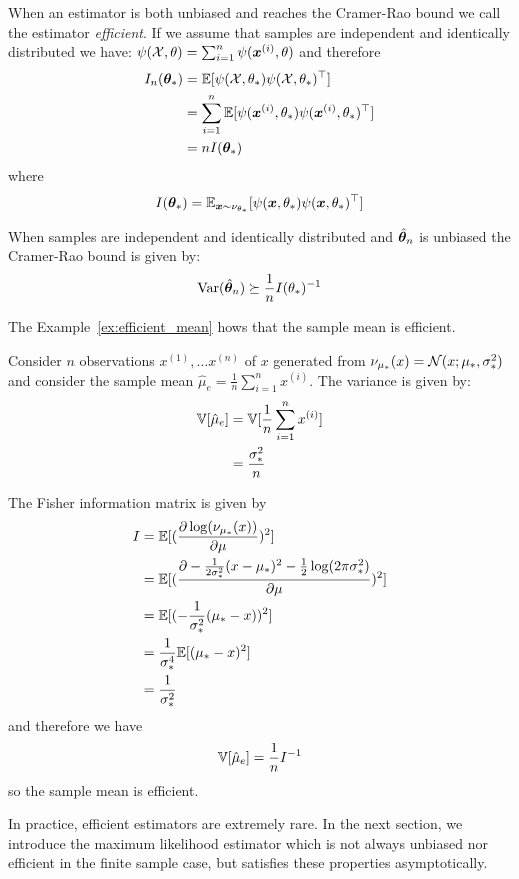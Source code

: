 When an estimator is both unbiased and reaches the Cramer-Rao bound we call the
estimator \emph{efficient}.
If we assume that samples are independent and identically distributed we
have: $\psi(\mathcal{X}, \theta) = \sum_{i=1}^n \psi(\boldsymbol{x}^{(i)}, \theta)$ and therefore
\begin{align}
  I_n(\boldsymbol{\theta}_*) &= \mathbb{E}[\psi(\mathcal{X}, \theta_*) \psi(\mathcal{X}, \theta_*)^{\top}] \\
                 &= \sum_{i=1}^n \mathbb{E}[\psi(\boldsymbol{x}^{(i)}, \theta_*) \psi(\boldsymbol{x}^{(i)}, \theta_*)^{\top}] \\
               &= n I(\boldsymbol{\theta}_*)
\end{align}
where
\begin{align}
  I(\boldsymbol{\theta}_*) = \mathbb{E}_{\boldsymbol{x} \sim \nu_{\theta_*}} [\psi(\boldsymbol{x}, \theta_*) \psi(\boldsymbol{x}, \theta_*)^{\top}]
\end{align}

When samples are independent and identically distributed and $\hat{\boldsymbol{\theta}}_n$ is unbiased the Cramer-Rao
bound is given by:
\begin{equation}
  \operatorname*{Var}(\hat{\boldsymbol{\theta}}_n) \succeq \frac1{n} I(\theta_*)^{-1}
\end{equation}

The Example~\ref{ex:efficient_mean} hows that the sample mean
is efficient.
\begin{example}
  \label{ex:efficient_mean}
  Consider $n$ observations $x^{(1)},
  \dots x^{(n)}$ of $x$ generated from $\nu_{\mu_*}(x) = \mathcal{N}(x; \mu_*, \sigma_*^2)$
  and consider the sample mean $\hat{\mu}_e = \frac1{n} \sum_{i=1}^n x^{(i)}$.
  The variance is given by:
  \begin{align}
    \mathbb{V}[\hat{\mu}_e] &= \mathbb{V}[\frac1{n} \sum_{i=1}^n x^{(i)}] \\
    &= \frac{\sigma_*^2}{n}
  \end{align}

  The Fisher information matrix is given by
  \begin{align}
    I &= \mathbb{E}[(\frac{ \partial \log(\nu_{\mu_*}(x))}{\partial \mu})^2] \\
      &= \mathbb{E}[(\frac{ \partial -\frac1{2 \sigma_*^2} (x - \mu_*)^2 - \frac12\log(2\pi \sigma_*^2)}{\partial \mu})^2] \\
      &= \mathbb{E}[(-\frac1{\sigma_*^2} (\mu_* - x))^2] \\
      &= \frac1{\sigma_*^4}\mathbb{E} [(\mu_* - x)^2] \\
      &= \frac1{\sigma_*^2}
  \end{align}
  and therefore we have
  \begin{equation}
  \mathbb{V}[\hat{\mu}_e]  = \frac1{n} I^{-1}
  \end{equation}
  so the sample mean is efficient.
\end{example}
In practice, efficient estimators are extremely rare. In the next section, we
introduce the maximum likelihood estimator which is not always unbiased nor
efficient in the finite sample case, but satisfies these properties asymptotically.

